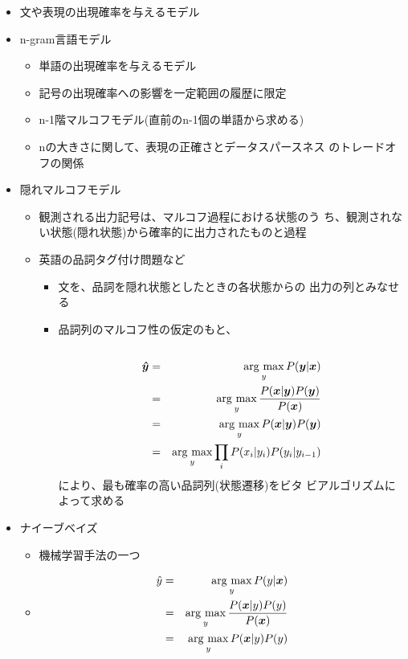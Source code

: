\documentclass[a4j,11pt]{jsarticle}
\newcommand{\argmax}{\mathop{\rm arg~max}\limits}
\begin{document}
\begin{itemize}
\begin{itemize}
	\item 文や表現の出現確率を与えるモデル
	\item n-gram言語モデル
	      \begin{itemize}
	       \item 単語の出現確率を与えるモデル
	       \item 記号の出現確率への影響を一定範囲の履歴に限定
	       \item n-1階マルコフモデル(直前のn-1個の単語から求める)
	       \item nの大きさに関して、表現の正確さとデータスパースネス
		     のトレードオフの関係
	      \end{itemize}
	\item 隠れマルコフモデル
	      \begin{itemize}
	       \item 観測される出力記号は、マルコフ過程における状態のう
		     ち、観測されない状態(隠れ状態)から確率的に出力されたものと過程
	       \item 英語の品詞タグ付け問題など
		     \begin{itemize}
		      \item 文を、品詞を隠れ状態としたときの各状態からの
			    出力の列とみなせる
		      \item 品詞列のマルコフ性の仮定のもと、
		      \begin{eqnarray*}\\
		       \bm{\hat{y}} & = & \argmax_{y} P(\bm{y}|\bm{x}) \\
		       &=& \argmax_{y}
			\frac{P(\bm{x}|\bm{y})P(\bm{y})}{P(\bm{x})} \\
		       &=& \argmax_{y}P(\bm{x}|\bm{y})P(\bm{y}) \\
		       &=& \argmax_{y} \prod_i{P(x_i|y_i)P(y_i|y_{i-1})}
		      \end{eqnarray*}
			    により、最も確率の高い品詞列(状態遷移)をビタ
			    ビアルゴリズムによって求める
		     \end{itemize}
	      \end{itemize}
	\item ナイーブベイズ
	      \begin{itemize}
	       \item 機械学習手法の一つ
	       \item \begin{eqnarray*}
		\hat{y} & = & \argmax_{y} P(y|\bm{x}) \\
		      &=& \argmax_{y}
		       \frac{P(\bm{x}|y)P(y)}{P(\bm{x})} \\
		      &=& \argmax_{y}P(\bm{x}|y)P(y) \\

\end{eqnarray*}
\end{itemize}
\end{itemize}
\end{itemize}
\end{document}
